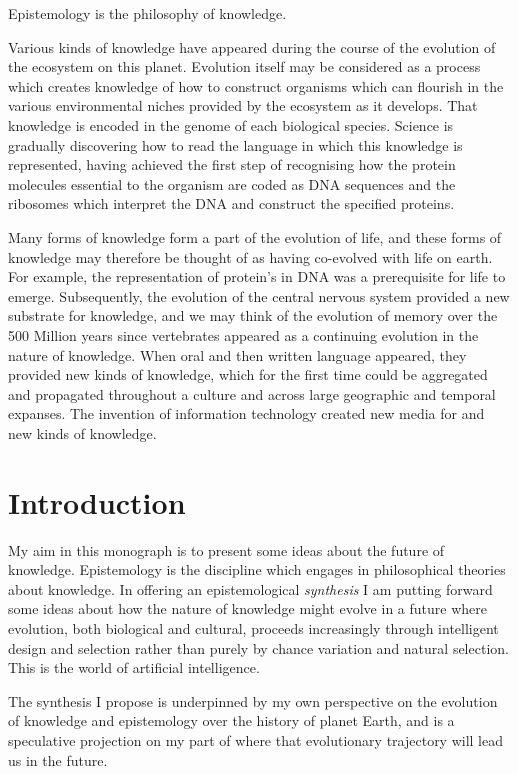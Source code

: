 \documentclass[10pt,titlepage]{book}
\begin{document}
Epistemology is the philosophy of knowledge.

Various kinds of knowledge have appeared during the course of the evolution of the ecosystem on this planet.
Evolution itself may be considered as a process which creates knowledge of how to construct organisms which can flourish in the various environmental niches provided by the ecosystem as it develops.
That knowledge is encoded in the genome of each biological species.
Science is gradually discovering how to read the language in which this knowledge is represented, having achieved the first step of recognising how the protein molecules essential to the organism are coded as DNA sequences and the ribosomes which interpret the DNA and construct the specified proteins.

Many forms of knowledge form a part of the evolution of life, and these forms of knowledge may therefore be thought of as having co-evolved with life on earth.
For example, the representation of protein's in DNA was a prerequisite for life to emerge.
Subsequently, the evolution of the central nervous system provided a new substrate for knowledge, and we may think of the evolution of memory over the 500 Million years since vertebrates appeared as a continuing evolution in the nature of knowledge.
When oral and then written language appeared, they provided new kinds of knowledge, which for the first time could be aggregated and propagated throughout a culture and across large geographic and temporal expanses.
The invention of information technology created new media for and new kinds of knowledge.


\chapter{Introduction}

My aim in this monograph is to present some ideas about the future of knowledge.
Epistemology is the discipline which engages in philosophical theories about knowledge.
In offering an epistemological \emph{synthesis} I am putting forward some ideas about how the nature of knowledge might evolve in a future where evolution, both biological and cultural, proceeds increasingly through intelligent design and selection rather than purely by chance variation and natural selection.
This is the world of artificial intelligence.

The synthesis I propose is underpinned by my own perspective on the evolution of knowledge and epistemology over the history of planet Earth, and is a speculative projection on my part of where that evolutionary trajectory will lead us in the future.
\end{document}
